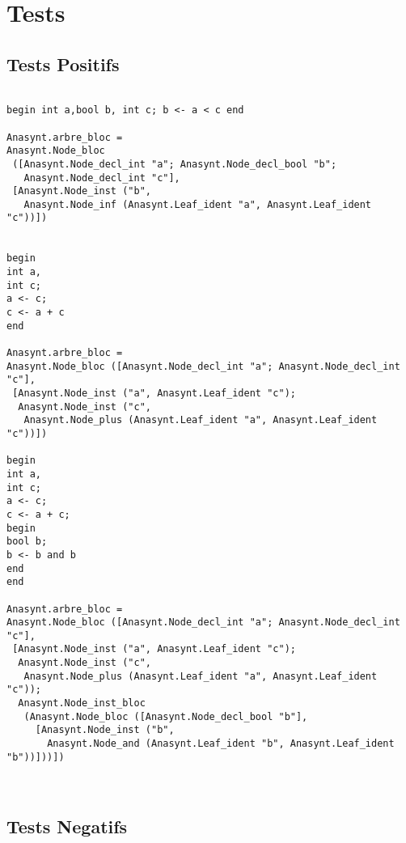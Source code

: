 \documentclass[a4paper]{article}
\begin{document}
\section{Tests}

\subsection{Tests Positifs}

\begin{lstlisting}

begin int a,bool b, int c; b <- a < c end

Anasynt.arbre_bloc =
Anasynt.Node_bloc
 ([Anasynt.Node_decl_int "a"; Anasynt.Node_decl_bool "b";
   Anasynt.Node_decl_int "c"],
 [Anasynt.Node_inst ("b",
   Anasynt.Node_inf (Anasynt.Leaf_ident "a", Anasynt.Leaf_ident "c"))])


begin
int a,
int c;
a <- c;
c <- a + c
end

Anasynt.arbre_bloc =
Anasynt.Node_bloc ([Anasynt.Node_decl_int "a"; Anasynt.Node_decl_int "c"],
 [Anasynt.Node_inst ("a", Anasynt.Leaf_ident "c");
  Anasynt.Node_inst ("c",
   Anasynt.Node_plus (Anasynt.Leaf_ident "a", Anasynt.Leaf_ident "c"))])

begin
int a,
int c;
a <- c;
c <- a + c;
begin
bool b;
b <- b and b
end
end

Anasynt.arbre_bloc =
Anasynt.Node_bloc ([Anasynt.Node_decl_int "a"; Anasynt.Node_decl_int "c"],
 [Anasynt.Node_inst ("a", Anasynt.Leaf_ident "c");
  Anasynt.Node_inst ("c",
   Anasynt.Node_plus (Anasynt.Leaf_ident "a", Anasynt.Leaf_ident "c"));
  Anasynt.Node_inst_bloc
   (Anasynt.Node_bloc ([Anasynt.Node_decl_bool "b"],
     [Anasynt.Node_inst ("b",
       Anasynt.Node_and (Anasynt.Leaf_ident "b", Anasynt.Leaf_ident "b"))]))])



\end{lstlisting}

\subsection{Tests Negatifs}
\end{document}
